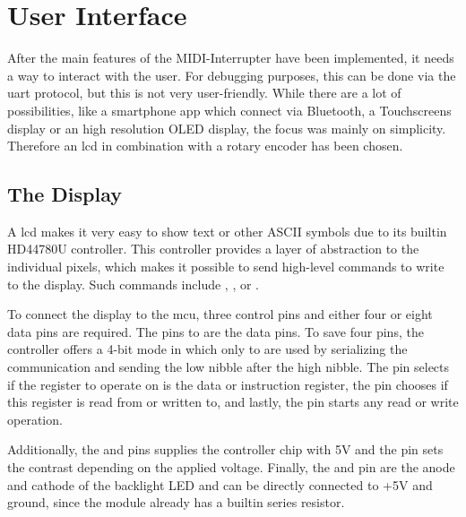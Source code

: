 \setchapterpreamble[u]{\margintoc}

\chapter{User Interface}
\label{ch:user-interface}

After the main features of the MIDI-Interrupter have been implemented, it needs a way to interact with the user. For debugging purposes, this can be done via the \gls{uart} protocol, but this is not very user-friendly. While there are a lot of possibilities, like a smartphone app which connect via Bluetooth, a Touchscreens display or an high resolution OLED display, the focus was mainly on simplicity. Therefore an \gls{lcd} in combination with a rotary encoder has been chosen.

\section{The Display}

A \gls{lcd} makes it very easy to show text or other ASCII symbols due to its builtin HD44780U controller. This controller provides a layer of abstraction to the individual pixels, which makes it possible to send high-level commands to write to the display. Such commands include , , or .

To connect the display to the \gls{mcu}, three control pins and either four or eight data pins are required. The pins  to  are the data pins. To save four pins, the controller offers a 4-bit mode in which only  to  are used by serializing the communication and sending the low \gls{nibble} after the high \gls{nibble}. The  pin selects if the register to operate on is the data or instruction register, the  pin chooses if this register is read from or written to, and lastly, the  pin starts any read or write operation.

Additionally, the  and  pins supplies the controller chip with 5V and the  pin sets the contrast depending on the applied voltage. Finally, the  and  pin are the anode and cathode of the backlight LED and can be directly connected to +5V and ground, since the module already has a builtin series resistor.

